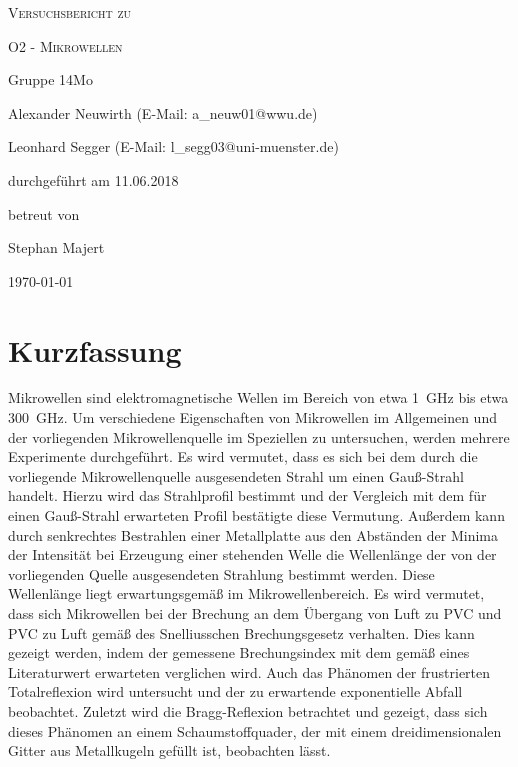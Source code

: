 \documentclass[
	a4paper,
	12pt,
	pagesize,
	ngerman
]{scrartcl}
\begin{document}
	
	\begin{titlepage}
		\centering
		{\scshape\LARGE Versuchsbericht zu \par}
		\vspace{1cm}
		{\scshape\huge O2 - Mikrowellen \par}
		\vspace{2.5cm}
		{\LARGE Gruppe 14Mo \par}
		\vspace{0.5cm}
		
		{\large Alexander Neuwirth (E-Mail: a\_neuw01@wwu.de) \par}
		{\large Leonhard Segger (E-Mail: l\_segg03@uni-muenster.de) \par}
		\vfill
		
		durchgeführt am 11.06.2018\par
		betreut von\par
		{\large Stephan Majert}
		
		\vfill
		
		{\large \today\par}
	\end{titlepage}
	\tableofcontents
	\newpage


	\section{Kurzfassung}
	Mikrowellen sind elektromagnetische Wellen im Bereich von etwa \SI{1}{\giga \Hz} bis etwa \SI{300}{\giga \hertz}.
	Um verschiedene Eigenschaften von Mikrowellen im Allgemeinen und der vorliegenden Mikrowellenquelle im Speziellen zu untersuchen, werden mehrere Experimente durchgeführt.
	Es wird vermutet, dass es sich bei dem durch die vorliegende Mikrowellenquelle ausgesendeten Strahl um einen Gauß-Strahl handelt.
	Hierzu wird das Strahlprofil bestimmt und der Vergleich mit dem für einen Gauß-Strahl erwarteten Profil bestätigte diese Vermutung.
	Außerdem kann durch senkrechtes Bestrahlen einer Metallplatte aus den Abständen der Minima der Intensität bei Erzeugung einer stehenden Welle die Wellenlänge der von der vorliegenden Quelle ausgesendeten Strahlung bestimmt werden. 
	Diese Wellenlänge liegt erwartungsgemäß im Mikrowellenbereich.
	Es wird vermutet, dass sich Mikrowellen bei der Brechung an dem Übergang von Luft zu PVC und PVC zu Luft gemäß des Snelliusschen Brechungsgesetz verhalten.
	Dies kann gezeigt werden, indem der gemessene Brechungsindex mit dem gemäß eines Literaturwert erwarteten verglichen wird.
	Auch das Phänomen der frustrierten Totalreflexion wird untersucht und der zu erwartende exponentielle Abfall beobachtet.
	Zuletzt wird die Bragg-Reflexion betrachtet und gezeigt, dass sich dieses Phänomen an einem Schaumstoffquader, der mit einem dreidimensionalen Gitter aus Metallkugeln gefüllt ist, beobachten lässt.
	
\end{document}
